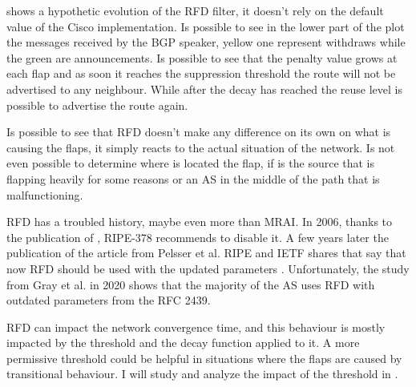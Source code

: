  shows a hypothetic evolution of the \ac{RFD} filter,
it doesn't rely on the default value of the Cisco implementation.
Is possible to see in the lower part of the plot the messages received by the
\ac{BGP} speaker, yellow one represent withdraws while the green are announcements.
Is possible to see that the penalty value grows at each flap and as soon it reaches
the suppression threshold the route will not be advertised to any neighbour.
While after the decay has reached the reuse level is possible to advertise the
route again.

Is possible to see that \ac{RFD} doesn't make any difference on its own on what
is causing the flaps, it simply reacts to the actual situation of the network.
Is not even possible to determine where is located the flap, if is the source
that is flapping heavily for some reasons or an \ac{AS} in the middle of the
path that is malfunctioning.

\ac{RFD} has a troubled history, maybe even more than \ac{MRAI}.
In \num{2006}, thanks to the publication of \cite{mao2002route}, RIPE-378
\cite{smith2006ripe} recommends to disable it.
A few years later the publication of the article from Pelsser et al. \cite{pelsser2011route}
RIPE and IETF shares that say that now \ac{RFD} should be used with the updated
parameters \cite{bush2013ripe,rfc7196}.
Unfortunately, the study from Gray et al. \cite{gray2020bgp} in \num{2020} shows
that the majority of the \ac{AS} uses \ac{RFD} with outdated parameters 
from the \ac{RFC} {2439}.

\ac{RFD} can impact the network convergence time, and this behaviour is 
mostly impacted by the threshold and the decay function applied to it.
A more permissive threshold could be helpful in situations where the flaps are
caused by transitional behaviour.
I will study and analyze the impact of the threshold in .


